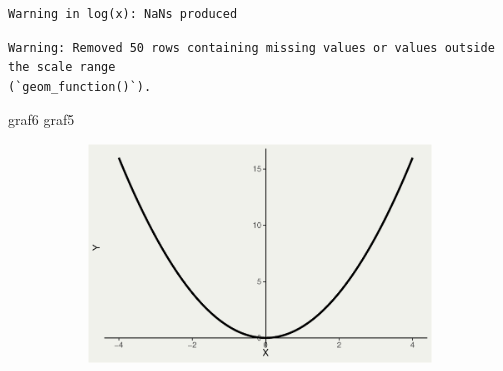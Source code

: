 \documentclass[
  letterpaper,
  DIV=11,
  numbers=noendperiod]{scrartcl}
\newenvironment{Shaded}{\begin{snugshade}}{\end{snugshade}}
\newcommand{\NormalTok}[1]{\textcolor[rgb]{0.00,0.23,0.31}{#1}}
\begin{document}
\begin{verbatim}
Warning in log(x): NaNs produced
\end{verbatim}

\begin{verbatim}
Warning: Removed 50 rows containing missing values or values outside the scale range
(`geom_function()`).
\end{verbatim}

\begin{Shaded}
\begin{Highlighting}[]
\NormalTok{graf6}
\NormalTok{graf5}
\end{Highlighting}
\end{Shaded}

\begin{figure}

\begin{minipage}{0.33\linewidth}

\begin{figure}[H]

{\centering \includegraphics{index_files/figure-pdf/unnamed-chunk-5-1.pdf}

}


\end{figure}%

\end{minipage}%
%
\begin{minipage}{0.33\linewidth}

\begin{figure}[H]


\end{figure}
\end{minipage}
\end{figure}
\end{document}
